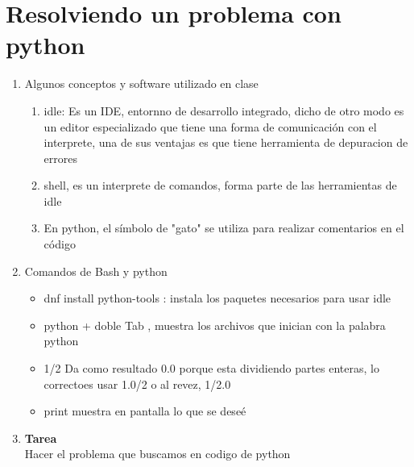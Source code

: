 \documentclass{book}
\begin{document}


\section{Resolviendo un problema con python\\}%
\begin{flushright}
	\date{10 de enero de 2019}
\end{flushright}


\begin{enumerate}%
	\item Algunos conceptos y software utilizado en clase%
	\begin{enumerate}
		\item idle: Es un IDE, entornno de desarrollo integrado, dicho de otro modo es un editor especializado que tiene una forma de comunicación con el interprete, una de sus ventajas es que tiene herramienta de depuracion de errores
		\item shell, es un interprete de comandos, forma parte de las herramientas de idle
		\item En python, el símbolo de "gato" se utiliza para realizar comentarios en el código
	\end{enumerate}
	
	\item Comandos de Bash y python %
	\begin{itemize}%
		\item dnf install python-tools : instala los paquetes necesarios para usar idle
		\item python + doble Tab , muestra los archivos que inician con la palabra python
		\item 1/2 Da como resultado 0.0 porque esta dividiendo partes enteras, lo correctoes usar 1.0/2 o al revez, 1/2.0
		\item print muestra en pantalla lo que se deseé
		
		
	\end{itemize}%
	
	\item \textbf{Tarea}
	\\
	Hacer el problema que buscamos en codigo de python
	
	
\end{enumerate}%
\end{document}
